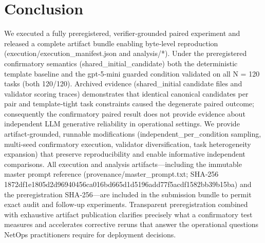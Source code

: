 \documentclass[conference]{IEEEtran}
\begin{document}
\section{Conclusion}
We executed a fully preregistered, verifier‑grounded paired experiment and released a complete artifact bundle enabling byte‑level reproduction (execution/execution\_manifest.json and analysis/*). Under the preregistered confirmatory semantics (shared\_initial\_candidate) both the deterministic template baseline and the gpt‑5‑mini guarded condition validated on all N = 120 tasks (both 120/120). Archived evidence (shared\_initial candidate files and validator scoring traces) demonstrates that identical canonical candidates per pair and template‑tight task constraints caused the degenerate paired outcome; consequently the confirmatory paired result does not provide evidence about independent LLM generative reliability in operational settings. We provide artifact‑grounded, runnable modifications (independent\_per\_condition sampling, multi‑seed confirmatory execution, validator diversification, task heterogeneity expansion) that preserve reproducibility and enable informative independent comparisons. All execution and analysis artifacts---including the immutable master prompt reference (provenance/master\_prompt.txt; SHA‑256 1872df1e1805d2d96940456ca016bd665d1d5196add77f5acdf1582bb39b15ba) and the preregistration SHA‑256---are included in the submission bundle to permit exact audit and follow‑up experiments. Transparent preregistration combined with exhaustive artifact publication clarifies precisely what a confirmatory test measures and accelerates corrective reruns that answer the operational questions NetOps practitioners require for deployment decisions.
\end{document}
